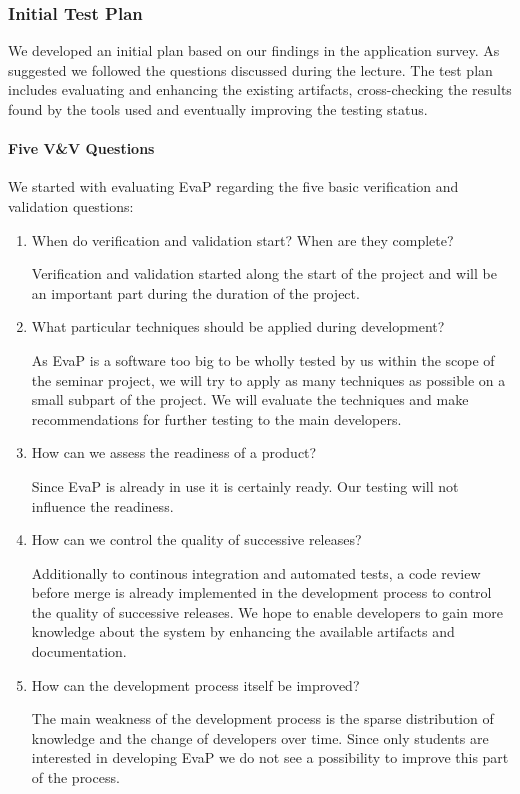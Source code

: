 \subsubsection{Initial Test Plan}
We developed an initial plan based on our findings in the application survey.
As suggested we followed the questions discussed during the lecture.
The test plan includes evaluating and enhancing the existing artifacts, cross-checking the results found by the tools used and eventually improving the testing status.

\paragraph{Five V\&V Questions}
We started with evaluating EvaP regarding the five basic verification and validation questions:
\begin{enumerate}
	\item When do verification and validation start? When are they complete?
    
    Verification and validation started along the start of the project and will be an important part during the duration of the project. 
	\item What particular techniques should be applied during development?
    
    As EvaP is a software too big to be wholly tested by us within the scope of the seminar project, we will try to apply as many techniques as possible on a small subpart of the project.
    We will evaluate the techniques and make recommendations for further testing to the main developers.
	\item How can we assess the readiness of a product?
    
    Since EvaP is already in use it is certainly ready. Our testing will not influence the readiness.
	\item How can we control the quality of successive releases?
    
    Additionally to continous integration and automated tests, a code review before merge is already implemented in the development process to control the quality of successive releases.
    We hope to enable developers to gain more knowledge about the system by enhancing the available artifacts and documentation.
	\item How can the development process itself be improved?
    
    The main weakness of the development process is the sparse distribution of knowledge and the change of developers over time.
    Since only students are interested in developing EvaP we do not see a possibility to improve this part of the process.
\end{enumerate}

